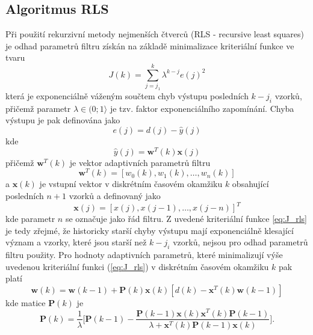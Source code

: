 \subsection{Algoritmus RLS}
Při použití rekurzivní metody nejmenších čtverců (RLS - recursive least squares) je odhad parametrů filtru získán na základě minimalizace kriteriální funkce ve tvaru
\begin{equation}\label{eq:J_rls}
    J(k)=\sum_{j=j_1}^k \lambda^{k-j} e(j)^2
\end{equation}
která je exponenciálně váženým součtem chyb výstupu posledních $k-j_i$ vzorků, přičemž parametr $\lambda \in (0;1\rangle$ je tzv. faktor exponenciálního zapomínání. Chyba výstupu je pak definována jako
\begin{equation}
    e(j)=d(j)-\hat{y}(j)
\end{equation}
kde
\begin{equation}
    \hat{y}(j)=\textbf{w}^T(k)\textbf{x}(j)
\end{equation}
přičemž $\textbf{w}^T(k)$ je vektor adaptivních parametrů filtru
\begin{equation}
    \textbf{w}^T(k)=[w_0(k),w_1(k),\dots,w_n(k)]
\end{equation}
a $\textbf{x}(k)$ je vstupní vektor v diskrétním časovém okamžiku $k$ obsahující posledních $n+1$ vzorků a definovaný jako
\begin{equation}
    \textbf{x}(j)=[x(j), x(j-1), \dots, x(j-n)]^T
\end{equation}
kde parametr $n$ se označuje jako řád filtru. Z uvedené kriteriální funkce \ref{eq:J_rls} je tedy zřejmé, že historicky starší chyby výstupu mají exponenciálně klesající význam a vzorky, které jsou starší než $k-j_i$ vzorků, nejsou pro odhad parametrů filtru použity.  Pro hodnoty adaptivních parametrů, které minimalizují výše uvedenou kriteriální funkci (\ref{eq:J_rls}) v diskrétním časovém okamžiku $k$ pak platí
\begin{equation}\label{eq:rls_update}
    \textbf{w}(k)=\textbf{w}(k-1)+\textbf{P}(k)\textbf{x}(k)[d(k)-\textbf{x}^T(k)\textbf{w}(k-1)]
\end{equation}
kde matice $\textbf{P}(k)$ je 
\begin{equation}
\textbf{P}(k)=\frac{1}{\lambda}\Bigg[\textbf{P}(k-1)- \frac{\textbf{P}(k-1)\textbf{x}(k)\textbf{x}^T(k)\textbf{P}(k-1)}{\lambda+\textbf{x}^T(k)\textbf{P}(k-1)\textbf{x}(k)}\Bigg].
\end{equation}

